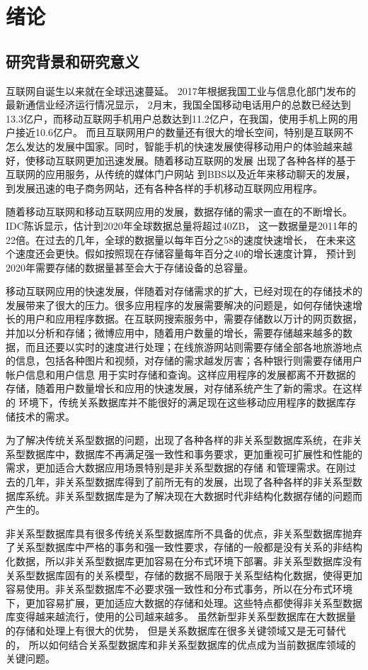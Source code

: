 
\chapter{绪论}
\section{研究背景和研究意义}
互联网自诞生以来就在全球迅速蔓延。
2017年根据我国工业与信息化部门发布的最新通信业经济运行情况显示，
2月末，我国全国移动电话用户的总数已经达到13.3亿户，而移动互联网手机用户总数达到11.2亿户，在我国，使用手机上网的用户接近10.6亿户。
而且互联网用户的数量还有很大的增长空间，特别是互联网不怎么发达的发展中国家。同时，智能手机的快速发展使得移动用户的体验越来越好，使移动互联网更加迅速发展。随着移动互联网的发展
出现了各种各样的基于互联网的应用服务，从传统的媒体门户网站
到BBS以及近年来移动聊天的发展，到发展迅速的电子商务网站，还有各种各样的手机移动互联网应用程序。

随着移动互联网和移动互联网应用的发展，数据存储的需求一直在的不断增长。
IDC陈诉显示，估计到2020年全球数据总量将超过40ZB，
这一数据量是2011年的22倍。在过去的几年，全球的数据量以每年百分之58的速度快速增长，
在未来这个速度还会更快。假如按照现在存储容量每年百分之40的增长速度计算，
预计到2020年需要存储的数据量甚至会大于存储设备的总容量。

移动互联网应用的快速发展，伴随着对存储需求的扩大，已经对现在的存储技术的发展带来了很大的压力。很多应用程序的发展需要解决的问题是，如何存储快速增长的用户和应用程序数据。在互联网搜索服务中，需要存储数以万计的网页数据，并加以分析和存储；微博应用中，随着用户数量的增长，需要存储越来越多的数据，而且还要以实时的速度进行处理；在线旅游网站则需要存储全部各地旅游地点的信息，包括各种图片和视频，对存储的需求越发厉害；各种银行则需要存储用户帐户信息和用户信息
用于实时存储和查询。这样应用程序的发展都离不开数据的存储，随着用户数量增长和应用的快速发展，对存储系统产生了新的需求。在这样的
环境下，传统关系数据库并不能很好的满足现在这些移动应用程序的数据库存储技术的需求。

为了解决传统关系型数据的问题，出现了各种各样的非关系型数据库系统，在非关系型数据库中，数据库不再满足强一致性和事务要求，更加重视可扩展性和性能的需求，更加适合大数据应用场景特别是非关系型数据的存储
和管理需求。在刚过去的几年，非关系型数据库得到了前所无有的发展，出现了各种各样的非关系型数据库系统。非关系型数据库是为了解决现在大数据时代非结构化数据存储的问题而产生的。

非关系型数据库具有很多传统关系型数据库所不具备的优点，非关系型数据库抛弃了关系型数据库中严格的事务和强一致性要求，存储的一般都是没有关系的非结构化数据，所以非关系型数据库更加容易在分布式环境下部署。非关系型数据库没有关系型数据库固有的关系模型，存储的数据不局限于关系型结构化数据，使得更加容易使用。非关系型数据库不必要求强一致性和分布式事务，所以在分布式环境下，更加容易扩展，更加适应大数据的存储和处理。这些特点都使得非关系型数据库变得越来越流行，使用的公司越来越多。
虽然新型非关系型数据库在大数据量的存储和处理上有很大的优势，
但是关系数据库在很多关键领域又是无可替代的，
所以如何结合关系型数据库和非关系型数据库的优点成为当前数据库领域的关键问题。

